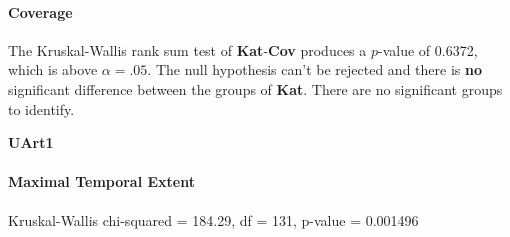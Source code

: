 \paragraph{Coverage}
The Kruskal-Wallis rank sum test of \textbf{Kat}-\textbf{Cov} produces a $p$-value of 0.6372, which is above $\alpha=.05$. The null hypothesis can't be rejected and there is \textbf{no} significant difference between the groups of \textbf{Kat}. There are no significant groups to identify.

\Large
\centerline{\textbf{UArt1}}
\normalsize

\paragraph{Maximal Temporal Extent}
Kruskal-Wallis chi-squared = 184.29, df = 131, p-value = 0.001496

